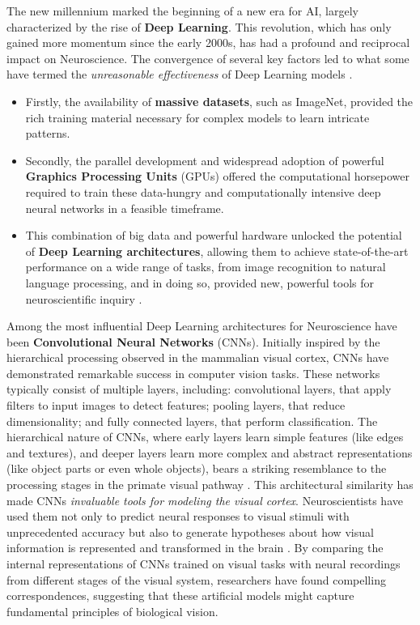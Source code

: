 The new millennium marked the beginning of a new era for AI, largely characterized by the rise of \textbf{Deep Learning}. This revolution, which has only gained more momentum since the early 2000s, has had a profound and reciprocal impact on Neuroscience. The convergence of several key factors led to what some have termed the \textit{unreasonable effectiveness} of Deep Learning models \cite{lecun2015deep}.
\begin{itemize}
    \item Firstly, the availability of \textbf{massive datasets}, such as ImageNet, provided the rich training material necessary for complex models to learn intricate patterns.
    \item Secondly, the parallel development and widespread adoption of powerful \textbf{Graphics Processing Units} (GPUs) offered the computational horsepower required to train these data-hungry and computationally intensive deep neural networks in a feasible timeframe.
    \item This combination of big data and powerful hardware unlocked the potential of \textbf{Deep Learning architectures}, allowing them to achieve state-of-the-art performance on a wide range of tasks, from image recognition to natural language processing, and in doing so, provided new, powerful tools for neuroscientific inquiry \cite{richards2019deep}.
\end{itemize}

Among the most influential Deep Learning architectures for Neuroscience have been \textbf{Convolutional Neural Networks} (CNNs). Initially inspired by the hierarchical processing observed in the mammalian visual cortex, CNNs have demonstrated remarkable success in computer vision tasks. These networks typically consist of multiple layers, including: convolutional layers, that apply filters to input images to detect features; pooling layers, that reduce dimensionality; and fully connected layers, that perform classification. The hierarchical nature of CNNs, where early layers learn simple features (like edges and textures), and deeper layers learn more complex and abstract representations (like object parts or even whole objects), bears a striking resemblance to the processing stages in the primate visual pathway \cite{yamins2016using}. This architectural similarity has made CNNs \textit{invaluable tools for modeling the visual cortex}. Neuroscientists have used them not only to predict neural responses to visual stimuli with unprecedented accuracy but also to generate hypotheses about how visual information is represented and transformed in the brain \cite{kriegeskorte2018cognitive, savage2019how}. By comparing the internal representations of CNNs trained on visual tasks with neural recordings from different stages of the visual system, researchers have found compelling correspondences, suggesting that these artificial models might capture fundamental principles of biological vision.

